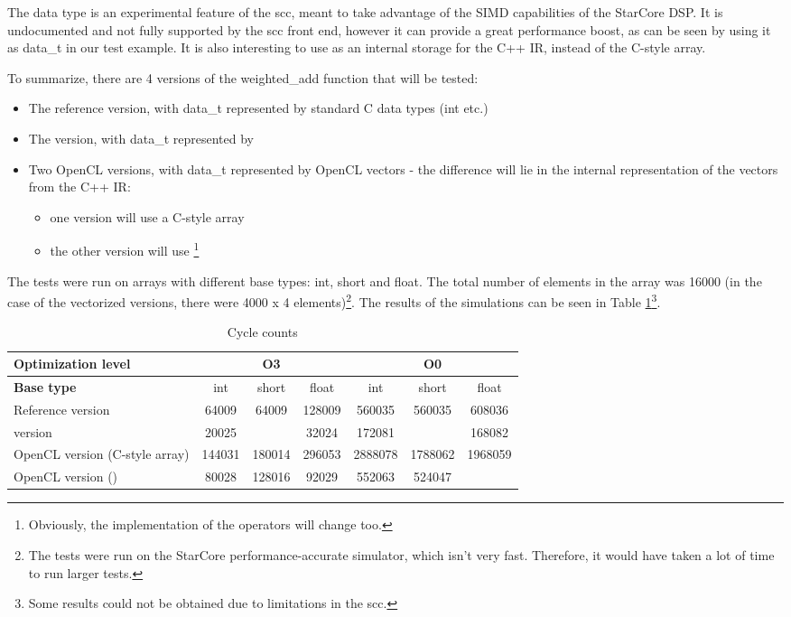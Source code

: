 The \vectype{} data type is an experimental feature of the scc, meant to take advantage of the SIMD capabilities of the StarCore DSP. It is undocumented and not fully supported by the scc front end, however it can provide a great performance boost, as can be seen by using it as data\_t in our test example. It is also interesting to use as an internal storage for the C++ IR, instead of the C-style array. 

To summarize, there are 4 versions of the weighted\_add function that will be tested:
\begin{itemize}
\item The reference version, with data\_t represented by standard C data types (int etc.)
\item The \vectype{} version, with data\_t represented by \vectype{}
\item Two OpenCL versions, with data\_t represented by OpenCL vectors - the difference will lie in the internal representation of the vectors from the C++ IR:
\begin{itemize}
\item one version will use a C-style array
\item the other version will use \vectype{}\footnote{Obviously, the implementation of the operators will change too.}
\end{itemize}
\end{itemize}

The tests were run on arrays with different base types: int, short and float. The total number of elements in the array was 16000 (in the case of the vectorized versions, there were 4000 x 4 elements)\footnote{The tests were run on the StarCore performance-accurate simulator, which isn't very fast. Therefore, it would have taken a lot of time to run larger tests.}. The results of the simulations can be seen in Table \ref{table:cycles}\footnote{Some results could not be obtained due to limitations in the scc.}.

\begin{table}[htb]
	\centering
  \caption{Cycle counts}
  \label{table:cycles}
  \begin{tabular}{|l|*{6}{c|}}
  	\hline
    \textbf{Optimization level}			& \multicolumn{3}{|c|}{O3} 		& \multicolumn{3}{|c|}{O0}		\\[2ex]
    \hline
    \textbf{Base type}							& int			& short		& float		& int			& short		& float		\\[2ex]
    \hline
    Reference version 							& 64009		& 64009		& 128009	& 560035	& 560035	& 608036	\\
    \hline
    \vectype{} version			 				& 20025		& 				& 32024		& 172081	&					& 168082	\\
    \hline
    OpenCL version (C-style array)	& 144031	& 180014	& 296053	& 2888078	& 1788062	& 1968059	\\
    \hline
    OpenCL version (\vectype{})		 	& 80028		& 128016	& 92029		& 552063	& 524047	& 				\\
    \hline
  \end{tabular}
\end{table}

